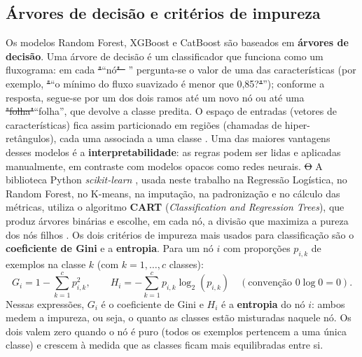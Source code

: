 \documentclass[msc]{on} %
\makeatletter
\providecommand{\DIFaddtex}[1]{{\protect\color{red}#1}} %
\providecommand{\DIFdeltex}[1]{{\protect\color{red}\sout{#1}}} %
\providecommand{\DIFaddbegin}{} %
\providecommand{\DIFaddend}{} %
\providecommand{\DIFdelbegin}{} %
\providecommand{\DIFdelend}{} %
\providecommand{\DIFadd}[1]{\texorpdfstring{\DIFaddtex{#1}}{#1}} %
\providecommand{\DIFdel}[1]{\texorpdfstring{\DIFdeltex{#1}}{}} %
\let\sout@orig\sout %
\renewcommand{\sout}[1]{\ifmmode\text{\sout@orig{\ensuremath{#1}}}\else\sout@orig{#1}\fi} %
\makeatother
\begin{document}
\subsection{Árvores de decisão e critérios de impureza}

Os modelos Random Forest, XGBoost e CatBoost são baseados em \textbf{árvores de decisão}. Uma árvore de decisão é um classificador que funciona como um fluxograma: em cada \DIFdelbegin \DIFdel{"}\DIFdelend \DIFaddbegin \DIFadd{``}\DIFaddend nó\DIFdelbegin \DIFdel{"~ }\DIFdelend \DIFaddbegin \DIFadd{'' }\DIFaddend pergunta-se o valor de uma das características (por exemplo, \DIFdelbegin \DIFdel{"}\DIFdelend \DIFaddbegin \DIFadd{``}\DIFaddend o mínimo do fluxo suavizado é menor que 0,85?\DIFdelbegin \DIFdel{"}\DIFdelend \DIFaddbegin \DIFadd{''}\DIFaddend ); conforme a resposta, segue-se por um dos dois ramos até um novo nó ou até uma \DIFdelbegin \DIFdel{"folha"}\DIFdelend \DIFaddbegin \DIFadd{``folha''}\DIFaddend , que devolve a classe predita. O espaço de entradas (vetores de características) fica assim particionado em regiões (\DIFaddbegin \DIFadd{chamadas de }\DIFaddend hiper-retângulos), cada uma associada a uma classe \citep{Levada2026}. Uma das maiores vantagens \DIFaddbegin \DIFadd{desses modelos }\DIFaddend é a \textbf{interpretabilidade}: as regras podem ser lidas e aplicadas manualmente, em contraste com modelos opacos como redes neurais. \DIFdelbegin \DIFdel{O }\DIFdelend \DIFaddbegin \DIFadd{A biblioteca Python }\DIFaddend \textit{scikit-learn} \citep{ScikitLearn2011}\DIFaddbegin \DIFadd{, usada neste trabalho na Regressão Logística, no Random Forest, no K-means, na imputação, na padronização e no cálculo das métricas, }\DIFaddend utiliza o algoritmo \textbf{CART} (\textit{Classification and Regression Trees}), que produz árvores binárias e escolhe, em cada nó, a divisão que maximiza a pureza dos nós filhos \citep{geron2019maos}. Os dois critérios de impureza mais usados para classificação são o \textbf{coeficiente de Gini} e a \textbf{entropia}. Para um nó \(i\) com proporções \(p_{i,k}\) de exemplos na classe \(k\) (com \(k=1,\ldots,c\) classes):
\begin{equation}
G_i = 1 - \sum_{k=1}^{c} p_{i,k}^2, \qquad
H_i = -\sum_{k=1}^{c} p_{i,k} \log_2(p_{i,k}) \quad (\text{convenção } 0\log 0 = 0).
\end{equation}
Nessas expressões, \(G_i\) é o coeficiente de Gini e \(H_i\) é a \textbf{entropia} do nó \(i\): ambos medem a impureza, ou seja, o quanto as classes estão misturadas naquele nó. Os dois valem zero quando o nó é puro (todos os exemplos pertencem a uma única classe) e crescem à medida que as classes ficam mais equilibradas entre si.
\end{document}
